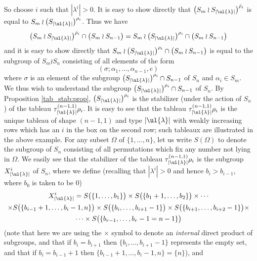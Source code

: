 So choose $i$ such that $|\lambda^i|>0$.
It is easy to show directly that $\bigl(S_m \wr S_{|\ul{\lambda}|}\bigr)^{\hat\rho_i}$ is equal to
$S_m \wr \bigl(S_{|\ul{\lambda}|}\bigr)^{\rho_i}$. Thus we have
\[\bigl(S_m \wr S_{|\ul{\lambda}|}\bigr)^{\hat\rho_i}\cap\bigl(S_m \wr S_{n-1}\bigr)
=
S_m \wr \bigl(S_{|\ul{\lambda}|}\bigr)^{\rho_i}\cap\bigl(S_m \wr S_{n-1}\bigr)\]
and it is easy to show directly that $S_m \wr \bigl(S_{|\ul{\lambda}|}\bigr)^{\rho_i}\cap\bigl(S_m \wr S_{n-1}\bigr)$
is equal to the subgroup of $S_m \wr S_n$ consisting of all elements of the form
\begin{equation}\label{elt_of_conj_intersect:eq}
(\sigma; \alpha_1,\ldots,\alpha_{n-1},e)
\end{equation}
where $\sigma$ is an element of the subgroup
$\bigl(S_{|\ul{\lambda}|}\bigr)^{\rho_i}\cap S_{n-1}$ of $S_n$
and $\alpha_i \in S_m$. We thus wish to understand the subgroup $\bigl(S_{|\ul{\lambda}|}\bigr)^{\rho_i}\cap S_{n-1}$ of $S_n$.
By Proposition \ref{tab_stab:prop}, $\bigl(S_{|\ul{\lambda}|}\bigr)^{\rho_i}$ is the stabilizer (under
the action of $S_n$) of the tableau $\tau^{(n-1,1)}_{|\ul{\lambda}|}\rho_i$. It is easy to see that the tableau
$\tau^{(n-1,1)}_{|\ul{\lambda}|}\rho_i$ is the unique tableau of shape $(n-1,1)$ and type $|\ul{\lambda}|$ with weakly increasing rows which
has an $i$ in the box on the second row; such tableaux are illustrated in the above example. For any subset $\Omega$ of $\{1,\ldots,n\}$,
let us write $S(\Omega)$ to denote the subgroup of
$S_n$ consisting of all permutations which fix any number not lying in $\Omega$. We easily see that the stabilizer of the tableau
$\tau^{(n-1,1)}_{|\ul{\lambda}|}\rho_i$ is the subgroup $X^i_{|\ul{\lambda}|}$ of $S_n$, where we define (recalling that $|\lambda^i|>0$ and hence
$b_i > b_{i-1}$, where $b_0$ is taken to be 0)
\begin{multline*}
X^i_{|\ul{\lambda}|} = S\bigl(\{1,\ldots,b_1\}\bigr) \times S\bigl(\{b_1+1,\ldots,b_2\}\bigr) \times \cdots\\
\times S\bigl(\{b_{i-1}+1,\ldots,b_i-1,n\}\bigr)\times
S\bigl(\{b_i,\ldots,b_{i+1}-1\}\bigr)\times S\bigl(\{b_{i+1},\ldots,b_{i+2}-1\}\bigr)\times\\
\cdots \times S\bigl(\{b_{r-1},\ldots,b_r-1 =n-1\}\bigr)
\end{multline*}
(note that here we are using the $\times$ symbol to denote an \textit{internal} direct product of subgroups, and that if $b_i = b_{i+1}$
then $\{b_i,\ldots,b_{i+1}-1\}$ represents the empty set, and that if $b_i = b_{i-1}+1$ then $\{b_{i-1}+1,\ldots,b_i-1,n\} = \{n\}$), and
